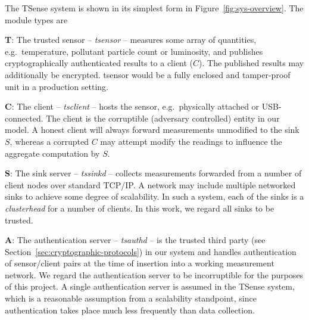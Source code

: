 The TSense system is shown in its simplest form in Figure~\ref{fig:sys-overview}. The module types are
%
\begin{description}

\item \textbf{T}: The trusted sensor -- \textit{tsensor} -- measures some array of quantities, e.g.\ temperature, pollutant particle count or luminosity, and publishes cryptographically authenticated results to a client ($C$). The published results may additionally be encrypted. tsensor would be a fully enclosed and tamper-proof unit in a production setting.

\item \textbf{C}: The client -- \textit{tsclient} -- hosts the sensor, e.g.\ physically attached or USB-connected. The client is the corruptible (adversary controlled) entity in our model. A honest client will always forward measurements unmodified to the sink $S$, whereas a corrupted $C$ may attempt modify the readings to influence the aggregate computation by $S$.

\item \textbf{S}: The sink server -- \textit{tssinkd} -- collects measurements forwarded from a number of client nodes over standard TCP/IP. A network may include multiple networked sinks to achieve some degree of scalability. In such a system, each of the sinks is a \textit{clusterhead} for a number of clients. In this work, we regard all sinks to be trusted.

\item \textbf{A}: The authentication server -- \textit{tsauthd} -- is the trusted third party (see Section~\ref{sec:cryptographic-protocols}) in our system and handles authentication of sensor/client pairs at the time of insertion into a working measurement network. 
We regard the authentication server to be incorruptible for the purposes of this project. A single authentication server is assumed in the TSense system, which is a reasonable assumption from a scalability standpoint, since authentication takes place much less frequently than data collection.

\end{description}

